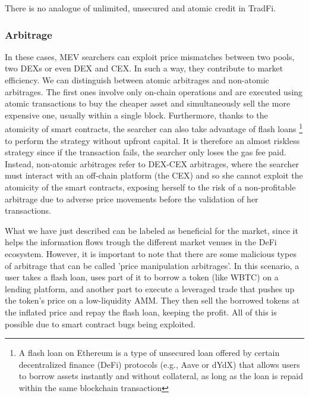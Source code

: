 \documentclass[a4paper,11pt]{article}
\begin{document}
There is no analogue of unlimited, unsecured and atomic credit in TradFi.

\subsubsection{Arbitrage}
In these cases, MEV searchers can exploit price mismatches between two pools, two DEXs or even DEX and CEX. In such a way, they contribute to market efficiency. We can distinguish between atomic arbitrages and non-atomic arbitrages. The first ones involve only on-chain operations and are executed using atomic transactions to buy the cheaper asset and simultaneously sell the more expensive one, usually within a single block. Furthermore, thanks to the atomicity of smart contracts, the searcher can also take advantage of flash loans \footnote{A flash loan on Ethereum is a type of unsecured loan offered by certain decentralized finance (DeFi) protocols (e.g., Aave or dYdX) that allows users to borrow assets instantly and without collateral, as long as the loan is repaid within the same blockchain transaction} to perform the strategy without upfront capital. It is therefore an almost riskless strategy since if the transaction fails, the searcher only loses the gas fee paid. Instead, non-atomic arbitrages refer to DEX-CEX arbitrages, where the searcher must interact with an off-chain platform (the CEX) and so she cannot exploit the atomicity of the smart contracts, exposing herself to the risk of a non-profitable arbitrage due to adverse price movements before the validation of her transactions.

What we have just described can be labeled as beneficial for the market, since it helps the information flows trough the different market venues in the DeFi ecosystem. However, it is important to note that there are some malicious types of arbitrage that can be called 'price manipulation arbitrages'. In this scenario, a user takes a flash loan, uses part of it to borrow a token (like WBTC) on a lending platform, and another part to execute a leveraged trade that pushes up the token’s price on a low-liquidity AMM. They then sell the borrowed tokens at the inflated price and repay the flash loan, keeping the profit. All of this is possible due to smart contract bugs being exploited.
\end{document}
